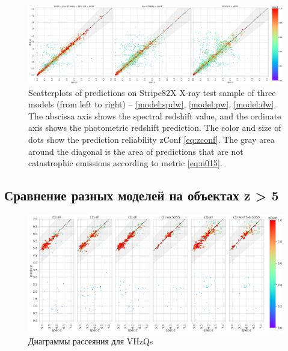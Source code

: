 \documentclass[fleqn,usenatbib]{mnras}
\begin{document}
\begin{figure}
    \centering
    \includegraphics[width=0.9\linewidth]{images/scatterplots-stripe82x.png}
    \caption{Scatterplots of predictions on Stripe82X X-ray test sample of three models (from left to right) -- \ref{model:spdw}, \ref{model:pw}, \ref{model:dw}. The abscissa axis shows the spectral redshift value, and the ordinate axis shows the photometric redshift prediction. The color and size of dots show the prediction reliability zConf \eqref{eq:zconf}. The gray area around the diagonal is the area of predictions that are not catastrophic emissions according to metric \eqref{eq:n015}.}
    \label{fig:scatter-s82x}
\end{figure}

\subsection{Сравнение разных моделей на объектах z > 5}

\begin{figure}
    \centering
    \includegraphics[width=0.9\linewidth]{images/vhzqs-gr5.png}
    \caption{Диаграммы рассеяния для VHzQs}
    \label{fig:vhzqs-gr5}
\end{figure}
\end{document}
